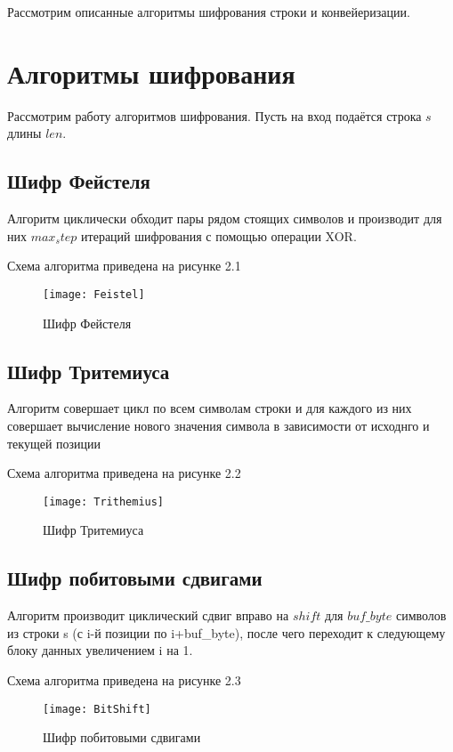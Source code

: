 Рассмотрим описанные алгоритмы шифрования строки и конвейеризации.

\section{Алгоритмы шифрования}
Рассмотрим работу алгоритмов шифрования. Пусть на вход подаётся строка $s$ длины $len$.

	\subsection{Шифр Фейстеля}
	Алгоритм циклически обходит пары рядом стоящих символов и производит для них $max_step$ итераций шифрования с помощью операции XOR.
	
	Схема алгоритма приведена на рисунке 2.1
	\begin{figure}[h]
		\begin{center}
			{\texttt{[image: Feistel]}}
			\caption{Шифр Фейстеля}
		\end{center}
	\end{figure}


	\subsection{Шифр Тритемиуса}
	Алгоритм совершает цикл по всем символам строки и для каждого из них совершает вычисление нового значения символа в зависимости от исходнго и текущей позиции
	
	Схема алгоритма приведена на рисунке 2.2
	\begin{figure}[h]
		\begin{center}
			{\texttt{[image: Trithemius]}}
			\caption{Шифр Тритемиуса}
		\end{center}
	\end{figure}


	\subsection{Шифр побитовыми сдвигами}
	Алгоритм производит циклический сдвиг вправо на $shift$ для $buf\_byte$ символов из строки s (с i-й позиции по i+buf\_byte), после чего переходит к следующему блоку данных увеличением i на 1.
	
	Схема алгоритма приведена на рисунке 2.3
	\begin{figure}[h]
		\begin{center}
			{\texttt{[image: BitShift]}}
			\caption{Шифр побитовыми сдвигами}
		\end{center}
	\end{figure}


